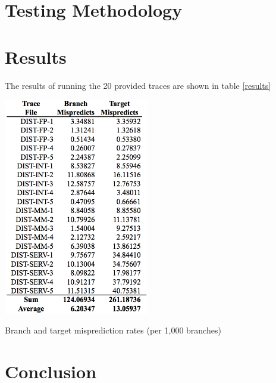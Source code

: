 \documentclass[twocolumn]{article}
\newcommand{\centertable}[3]{
\begin{table}[ht!]  
\begin{center} #1
\caption{#2}
\label{#3}
\end{center}
\end{table}}
\begin{document}
\section{Testing Methodology}


\section{Results}
The results of running the 20 provided traces are shown in table \ref{results}
\centertable{\includegraphics[width=2.5in]{img/results.png}}{Branch and target misprediction rates (per 1,000 branches)}{results}
\section{Conclusion}

\appendix
\onecolumn
\end{document}
